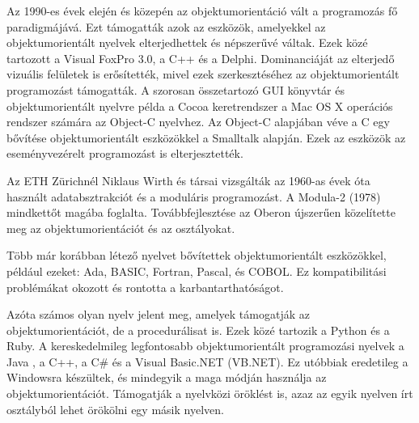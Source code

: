 \documentclass[a4paper,12pt,twoside]{report}
\theoremstyle{definition}
\begin{document}
	Az 1990-es évek elején és közepén az objektumorientáció vált a programozás fő paradigmájává. Ezt támogatták azok az eszközök, amelyekkel az objektumorientált nyelvek elterjedhettek és népszerűvé váltak. Ezek közé tartozott a Visual FoxPro 3.0, a C++ és a Delphi. Dominanciáját az elterjedő vizuális felületek is erősítették, mivel ezek szerkesztéséhez az objektumorientált programozást támogatták. A szorosan összetartozó GUI könyvtár és objektumorientált nyelvre példa a Cocoa keretrendszer a Mac OS X operációs rendszer számára az Object-C nyelvhez. Az Object-C alapjában véve a C egy bővítése objektumorientált eszközökkel a Smalltalk alapján. Ezek az eszközök az eseményvezérelt programozást is elterjesztették.
	
	Az ETH Zürichnél Niklaus Wirth és társai vizsgálták az 1960-as évek óta használt adatabsztrakciót és a moduláris programozást. A Modula-2 (1978) mindkettőt magába foglalta. Továbbfejlesztése az Oberon újszerűen közelítette meg az objektumorientációt és az osztályokat.
	
	Több már korábban létező nyelvet bővítettek objektumorientált eszközökkel, például ezeket: Ada, BASIC, Fortran, Pascal, és COBOL. Ez kompatibilitási problémákat okozott és rontotta a karbantarthatóságot.
	
	Azóta számos olyan nyelv jelent meg, amelyek támogatják az objektumorientációt, de a procedurálisat is. Ezek közé tartozik a Python és a Ruby. A kereskedelmileg legfontosabb objektumorientált programozási nyelvek a Java , a C++, a C\# és a Visual Basic.NET (VB.NET). Ez utóbbiak eredetileg a Windowsra készültek, és mindegyik a maga módján használja az objektumorientációt. Támogatják a nyelvközi öröklést is, azaz az egyik nyelven írt osztályból lehet örökölni egy másik nyelven.
	
\end{document}
